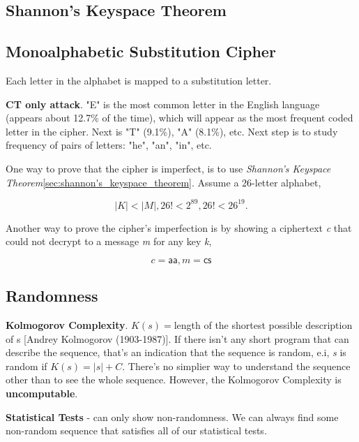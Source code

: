 \documentclass[12pt]{article}
\begin{document}
\subsection*{Shannon's Keyspace Theorem}
\label{sec:shannon's_keyspace_theorem}

\subsection*{Monoalphabetic Substitution Cipher}

Each letter in the alphabet is mapped to a substitution letter.

\textbf{CT only attack}. "E" is the most common letter in the English language (appears about 12.7\% of the time), which will appear as the most frequent coded letter in the cipher. Next is "T" (9.1\%), "A" (8.1\%), etc. Next step is to study frequency of pairs of letters: "he", "an", "in", etc.

One way to prove that the cipher is imperfect, is to use \emph{Shannon's Keyspace Theorem}\ref{sec:shannon's_keyspace_theorem}. Assume a 26-letter alphabet,

\begin{equation}
|K| < |M|, 26! < 2^{89}, 26! < 26^{19}.
\end{equation}

Another way to prove the cipher's imperfection is by showing a ciphertext \emph{c} that could not decrypt to a message \emph{m} for any key \emph{k},

\begin{equation}
c = \mathsf{aa}, m = \mathsf{cs}
\end{equation}

\subsection*{Randomness}
\textbf{Kolmogorov Complexity}.
$K(s) = $length of the shortest possible description of s [Andrey Kolmogorov (1903-1987)]. If there isn't any short program that can describe the sequence, that's an indication that the sequence is random, e.i, \emph{s} is random if $K(s) = |s| + C$. There's no simplier way to understand the sequence other than to see the whole sequence. However, the Kolmogorov Complexity is \textbf{uncomputable}.

\textbf{Statistical Tests} - can only show non-randomness. We can always find some non-random sequence that satisfies all of our statistical tests.
\end{document}
